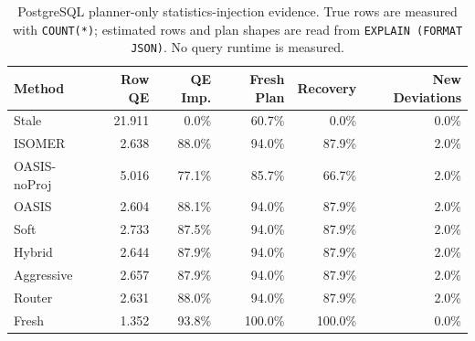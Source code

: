 \begin{table}[t]
  \centering
  \small
  \caption{PostgreSQL planner-only statistics-injection evidence. True rows are measured with \texttt{COUNT(*)}; estimated rows and plan shapes are read from \texttt{EXPLAIN (FORMAT JSON)}. No query runtime is measured.}
  \label{tab:postgres_planner_stats_injection}
  \setlength{\tabcolsep}{4pt}
  \begin{tabular}{lrrrrr}
    \toprule
    Method & Row QE & QE Imp. & Fresh Plan & Recovery & New Deviations \\
    \midrule
    Stale & 21.911 & 0.0\% & 60.7\% & 0.0\% & 0.0\% \\
    ISOMER & 2.638 & 88.0\% & 94.0\% & 87.9\% & 2.0\% \\
    OASIS-noProj & 5.016 & 77.1\% & 85.7\% & 66.7\% & 2.0\% \\
    OASIS & 2.604 & 88.1\% & 94.0\% & 87.9\% & 2.0\% \\
    Soft & 2.733 & 87.5\% & 94.0\% & 87.9\% & 2.0\% \\
    Hybrid & 2.644 & 87.9\% & 94.0\% & 87.9\% & 2.0\% \\
    Aggressive & 2.657 & 87.9\% & 94.0\% & 87.9\% & 2.0\% \\
    Router & 2.631 & 88.0\% & 94.0\% & 87.9\% & 2.0\% \\
    Fresh & 1.352 & 93.8\% & 100.0\% & 100.0\% & 0.0\% \\
    \bottomrule
  \end{tabular}
\end{table}
